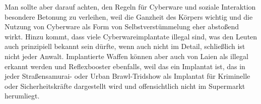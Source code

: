 \documentclass[a4paper]{scrartcl}
\begin{document}
Man sollte aber darauf achten, den Regeln für Cyberware und soziale Interaktion besondere Betonung zu verleihen, weil die
Ganzheit des Körpers wichtig und die Nutzung von Cyberware als Form von Selbstverstümmelung eher abstoßend wirkt.
Hinzu kommt, dass viele Cyberwareimplantate illegal sind, was den Leuten auch prinzipiell bekannt sein dürfte, wenn auch
nicht im Detail, schließlich ist nicht jeder Anwalt.
Implantierte Waffen können aber auch von Laien als illegal erkannt werden und Reflexbooster ebenfalls, weil das ein 
Implantat ist, das in jeder Straßensamurai- oder Urban Brawl-Tridshow als Implantat für Kriminelle oder Sicherheitskräfte
dargestellt wird und offensichtlich nicht im Supermarkt herumliegt.
\end{document}
